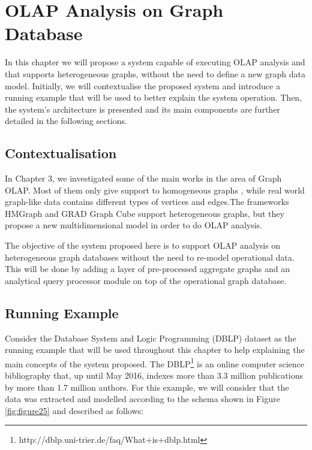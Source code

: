 \chapter{OLAP Analysis on Graph Database}
In this chapter we will propose a system capable of executing OLAP analysis and that supports heterogeneous graphs, without the need to define a new graph data model. Initially, we will contextualise the proposed system and introduce a running example that will be used to better explain the system operation. Then, the system's architecture is presented and its main components are further detailed in the following sections.

\section{Contextualisation}

In Chapter 3, we investigated some of the main works in the area of Graph OLAP. Most of them only give support to homogeneous graphs \cite{Zhao2011}\cite{Chen2008}\cite{Wang2014}, while real world graph-like data contains different types of vertices and edges.The frameworks HMGraph \cite{Yin2012} and GRAD Graph Cube \cite{ghrab2015framework} support heterogeneous graphs, but they propose a new multidimensional model in order to do OLAP analysis.

The objective of the system proposed here is to support OLAP analysis on heterogeneous graph databases without the need to re-model operational data. This will be done by adding a layer of pre-processed aggregate graphs and an analytical query processor module on top of the operational graph database.

\section{Running Example}
Consider the Database System and Logic Programming (DBLP) dataset as the running example that will be used throughout this chapter to help explaining the main concepts of the system proposed. The DBLP\footnote{http://dblp.uni-trier.de/faq/What+is+dblp.html} is an online computer science bibliography that, up until May 2016, indexes more than 3.3 million publications by more than 1.7 million authors. For this example, we will consider that the data was extracted and modelled according to the schema shown in Figure \ref{fig:figure25} and described as follows:

